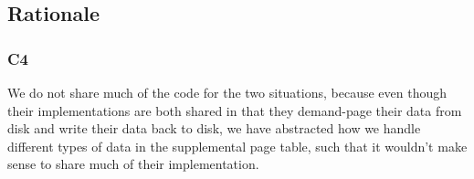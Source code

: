 \documentclass[a4wide, 11pt]{article}
\begin{document}
\subsection{Rationale}
\subsubsection{C4}

We do not share much of the code for the two situations, because even though their implementations are both shared in that they demand-page their data from disk and write their data back to disk, we have abstracted how we handle different types of data in the supplemental page table, such that it wouldn't make sense to share much of their implementation.
\end{document}
